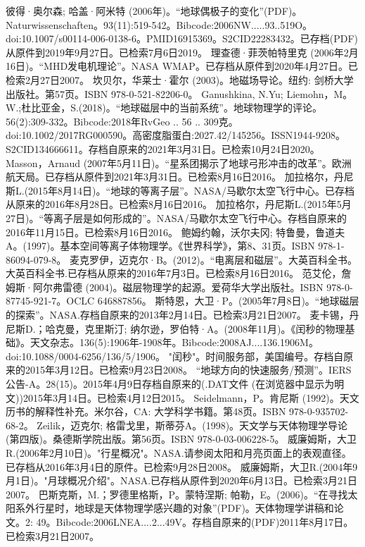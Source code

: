 \begin{enumerate}
 彼得·奥尔森; 哈盖·阿米特 (2006年)。“地球偶极子的变化”(PDF)。Naturwissenschaften。93(11):519-542。Bibcode:2006NW.....93..519O。doi:10.1007/s00114-006-0138-6。PMID16915369。S2CID22283432。已存档(PDF)从原件到2019年9月27日。已检索7月6日2019。   
 理查德·菲茨帕特里克 (2006年2月16日)。“MHD发电机理论”。NASA WMAP。已存档从原件到2020年4月27日。已检索2月27日2007。
 坎贝尔，华莱士·霍尔 (2003)。地磁场导论。纽约: 剑桥大学出版社。第57页。ISBN 978-0-521-82206-0。
 Ganushkina, N.Yu; Liemohn，M。W.;杜比亚金，S.(2018)。“地球磁层中的当前系统”。地球物理学的评论。56(2):309-332。Bibcode:2018年RvGeo .. 56 .. 309克。doi:10.1002/2017RG000590。高密度脂蛋白:2027.42/145256。ISSN1944-9208。S2CID134666611。存档自原来的2021年3月31日。已检索10月24日2020。  
 Masson，Arnaud (2007年5月11日)。“星系团揭示了地球弓形冲击的改革”。欧洲航天局。已存档从原件到2021年3月31日。已检索8月16日2016。
 加拉格尔，丹尼斯L.(2015年8月14日)。“地球的等离子层”。NASA/马歇尔太空飞行中心。已存档从原来的2016年8月28日。已检索8月16日2016。
 加拉格尔，丹尼斯L.(2015年5月27日)。“等离子层是如何形成的”。NASA/马歇尔太空飞行中心。存档自原来的2016年11月15日。已检索8月16日2016。
 鲍姆约翰，沃尔夫冈; 特鲁曼，鲁道夫A。(1997)。基本空间等离子体物理学。《世界科学》，第8、31页。ISBN 978-1-86094-079-8。
 麦克罗伊，迈克尔·B。(2012)。“电离层和磁层”。大英百科全书。大英百科全书.已存档从原来的2016年7月3日。已检索8月16日2016。
 范艾伦，詹姆斯·阿尔弗雷德 (2004)。磁层物理学的起源。爱荷华大学出版社。ISBN 978-0-87745-921-7。OCLC 646887856。
 斯特恩，大卫·P。(2005年7月8日)。“地球磁层的探索”。NASA.存档自原来的2013年2月14日。已检索3月21日2007。
 麦卡锡，丹尼斯D.；哈克曼，克里斯汀; 纳尔逊，罗伯特·A。(2008年11月)。《闰秒的物理基础》。天文杂志。136(5):1906年-1908年。Bibcode:2008AJ....136.1906M。doi:10.1088/0004-6256/136/5/1906。
 "闰秒"。时间服务部，美国编号。存档自原来的2015年3月12日。已检索9月23日2008。
 “地球方向的快速服务/预测”。IERS公告-A。28(15)。2015年4月9日存档自原来的(.DAT文件 (在浏览器中显示为明文))2015年3月14日。已检索4月12日2015。
 Seidelmann，P。肯尼斯 (1992)。天文历书的解释性补充。米尔谷，CA: 大学科学书籍。第48页。ISBN 978-0-935702-68-2。
 Zeilik，迈克尔; 格雷戈里，斯蒂芬A。(1998)。天文学与天体物理学导论(第四版)。桑德斯学院出版。第56页。ISBN 978-0-03-006228-5。
 威廉姆斯，大卫R.(2006年2月10日)。"行星概况"。NASA.请参阅太阳和月亮页面上的表观直径。已存档从2016年3月4日的原件。已检索9月28日2008。
 威廉姆斯，大卫R.(2004年9月1日)。"月球概况介绍"。NASA.已存档从原件到2020年6月13日。已检索3月21日2007。
 巴斯克斯，M.；罗德里格斯，P。蒙特涅斯; 帕勒，E。(2006)。“在寻找太阳系外行星时，地球是天体物理学感兴趣的对象”(PDF)。天体物理学讲稿和论文。2: 49。Bibcode:2006LNEA....2...49V。存档自原来的(PDF)2011年8月17日。已检索3月21日2007。

\end{enumerate}
